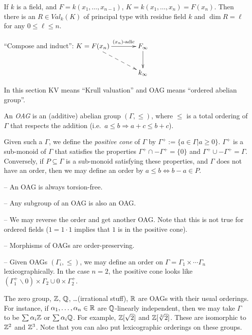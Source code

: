  \setcounter{lecture}{33}

 If $k$ is a field, and $F = k(x_1,\dots, x_{n-1})$, $K= k(x_1,\dots, x_n) = F(x_n)$.
 Then there is an $R\in Val_k(K)$ of principal type with residue field $k$ and $\dim
 R=\ell$ for any $0\le \ell\le n$.

 ``Compose and induct'':$\xymatrix@C+1pc{ K=F(x_n) \ar[r]^<>(.5){(x_n)\text{-adic}} \ar@{-->}[dr] &
 F_\infty \ar[d]\\
 & k_\infty}$

 In this section KV means ``Krull valuation'' and OAG means ``ordered abelian group''.

 \begin{definition}
   An \emph{OAG} is an (additive) abelian group $(\Gamma, \le)$, where $\le$ is a total
   ordering of $\Gamma$ that respects the addition (i.e.~$a\le b\Rightarrow a+c\le b+c$).
 \end{definition}
 Given such a $\Gamma$, we define the \emph{positive cone} of $\Gamma$ by
 $\Gamma^+:=\{a\in \Gamma| a\ge 0\}$. $\Gamma^+$ is a sub-monoid of $\Gamma$ that
 satisfies the properties $\Gamma^+\cap -\Gamma^+ = \{0\}$ and $\Gamma^+\cup
 -\Gamma^+=\Gamma$. Conversely, if $P\subseteq \Gamma$ is a sub-monoid satisfying these
 properties, and $\Gamma$ does not have an order, then we may define an order by $a\le b
 \Leftrightarrow b-a\in P$.

 \begin{remark}
 \begin{trivlist}
   \item
   \item -- An OAG is always torsion-free.
   \item -- Any subgroup of an OAG is also an OAG.
   \item -- We may reverse the order and get another OAG. Note that this is not true for
   ordered fields ($1=1\cdot 1$ implies that $1$ is in the positive cone).
   \item -- Morphisms of OAGs are order-preserving.
   \item -- Given OAGs $(\Gamma_i,\le)$, we may define an order on $\Gamma = \Gamma_1\times
   \cdots \Gamma_n$ lexicographically. In the case $n=2$, the positive cone looks like
   $(\Gamma_1^+\smallsetminus 0)\times \Gamma_2 \cup 0\times \Gamma_2^+$.
 \end{trivlist}
 \end{remark}
 \begin{example}
   The zero group, $\mathbb{Z}$, $\mathbb{Q}$, \dots (irrational stuff), $\mathbb{R}$ are OAGs with their
   usual orderings. For instance, if $\alpha_1,\dots, \alpha_n\in \mathbb{R}$ are $\mathbb{Q}$-linearly
   independent, then we may take $\Gamma$ to be $\sum \alpha_i \mathbb{Z}$ or $\sum \alpha_i
   \mathbb{Q}$. For example, $\mathbb{Z}[\sqrt 2]$ and $\mathbb{Z}[\sqrt[3] 2]$. These are isomorphic to
   $\mathbb{Z}^2$ and $\mathbb{Z}^3$. Note that you can also put lexicographic orderings on these
   groups.
 \end{example}


